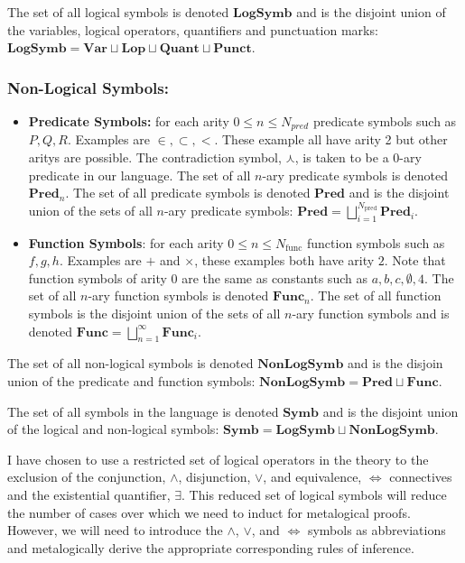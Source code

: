 \documentclass[12pt]{article}
\begin{document}
The set of all logical symbols is denoted $\textbf{LogSymb}$ and is the disjoint union of the variables, logical operators, quantifiers and punctuation marks: $\textbf{LogSymb} = \textbf{Var} \sqcup \textbf{Lop} \sqcup \textbf{Quant} \sqcup \textbf{Punct}$.

\hrulefill

\subsubsection*{Non-Logical Symbols:}
\begin{itemize}
\item{\textbf{Predicate Symbols:} for each arity $0 \le n \le N_{pred}$ predicate symbols such as $P, Q, R$. Examples are $\in, \subset, <$. These example all have arity 2 but other aritys are possible. The contradiction symbol, $\curlywedge$, is taken to be a 0-ary predicate in our language. The set of all $n$-ary predicate symbols is denoted $\textbf{Pred}_n$. The set of all predicate symbols is denoted $\textbf{Pred}$ and is the disjoint union of the sets of all $n$-ary predicate symbols: $\textbf{Pred} = \bigsqcup_{i=1}^{N_{\text{pred}}} \textbf{Pred}_i$.}
\item{\textbf{Function Symbols}: for each arity $0 \le n \le N_{\text{func}}$ function symbols such as $f, g, h$. Examples are $+$ and $\times$, these examples both have arity $2$. Note that function symbols of arity $0$ are the same as constants such as $a,b,c,\emptyset,4$. The set of all $n$-ary function symbols is denoted $\textbf{Func}_n$. The set of all function symbols is the disjoint union of the sets of all $n$-ary function symbols and is denoted $\textbf{Func} = \bigsqcup_{n=1}^\infty \textbf{Func}_i$.}
\end{itemize}

The set of all non-logical symbols is denoted $\textbf{NonLogSymb}$ and is the disjoin union of the predicate and function symbols: $\textbf{NonLogSymb} = \textbf{Pred} \sqcup \textbf{Func}$.

\hrulefill

The set of all symbols in the language is denoted $\textbf{Symb}$ and is the disjoint union of the logical and non-logical symbols: $\textbf{Symb} = \textbf{LogSymb} \sqcup \textbf{NonLogSymb}$.

\hrulefill

I have chosen to use a restricted set of logical operators in the theory to the exclusion of the conjunction, $\land$, disjunction, $\lor$, and equivalence, $\iff$ connectives and the existential quantifier, $\exists$.
This reduced set of logical symbols will reduce the number of cases over which we need to induct for metalogical proofs. 
However, we will need to introduce the $\land$, $\lor$, and $\iff$ symbols as abbreviations and metalogically derive the appropriate corresponding rules of inference.
\end{document}
